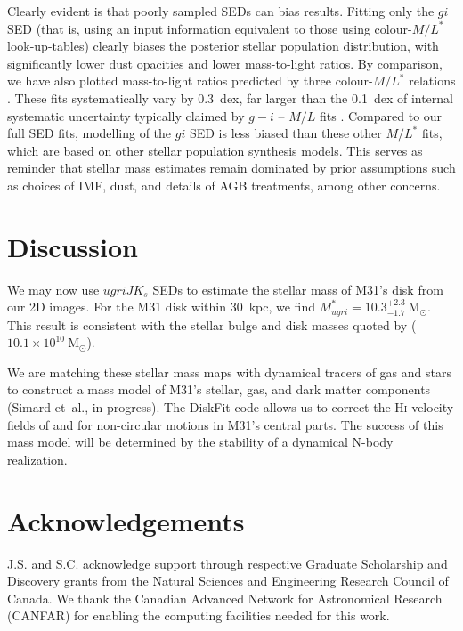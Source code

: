 \documentclass{iau}
\begin{document}
Clearly evident is that poorly sampled SEDs can bias results.
Fitting only the $gi$ SED (that is, using an input information equivalent to those using colour-$M/L^*$ look-up-tables) clearly biases the posterior stellar population distribution, with significantly lower dust opacities and lower mass-to-light ratios.
By comparison, we have also plotted mass-to-light ratios predicted by three colour-$M/L^*$ relations \citep{Zibetti:2009,Taylor:2011,Into:2013}.
These fits systematically vary by 0.3~dex, far larger than the 0.1~dex of internal systematic uncertainty typically claimed by $g-i$ -- $M/L$ fits \cite{Courteau:2014}.
Compared to our full SED fits, modelling of the $gi$ SED is less biased than these other $M/L^*$ fits, which are based on other stellar population synthesis models.
This serves as reminder that stellar mass estimates remain dominated by prior assumptions such as choices of IMF, dust, and details of AGB treatments, among other concerns.

\section{Discussion}

We may now use $ugriJK_s$ SEDs to estimate the stellar mass of M31's disk from our 2D images.
For the M31 disk within $30$~kpc, we find $M_{ugri}^{*} = 10.3^{+2.3}_{-1.7}~\mathrm{M}_\odot$.
This result is consistent with the stellar bulge and disk masses quoted by \cite{Tamm:2012} ($10.1\times10^{10}~\mathrm{M}_\odot$).

We are matching these stellar mass maps with dynamical tracers of gas and stars to construct a mass model of M31's stellar, gas, and dark matter components (Simard et~al., in progress). 
The DiskFit code \citep{Spekkens:2007} allows us to correct the H\textsc{i} velocity fields of \cite{Saglia:2010} and \cite{Chemin:2009} for non-circular motions in M31's central parts. 
The success of this mass model will be determined by the stability of a dynamical N-body realization.

\section*{Acknowledgements}

\noindent J.S. and S.C. acknowledge support through respective Graduate Scholarship and Discovery grants from the Natural Sciences and Engineering Research Council of Canada. We thank the Canadian Advanced Network for Astronomical Research (CANFAR) for enabling the computing facilities needed for this work.
\end{document}
